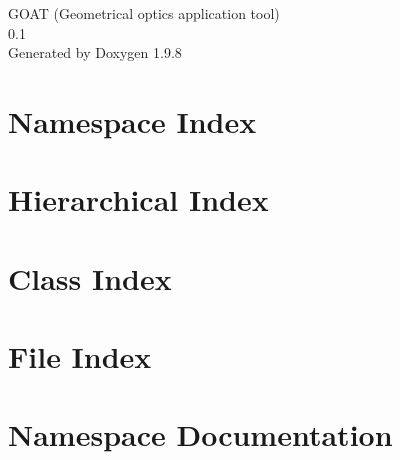 \documentclass[twoside]{book}
\newcommand{\+}{\discretionary{\mbox{\scriptsize$\hookleftarrow$}}{}{}}
\newcommand{\clearemptydoublepage}{%
    \newpage{\pagestyle{empty}\cleardoublepage}%
  }
\begin{document}
  \raggedbottom
    \hypersetup{pageanchor=false,
                bookmarksnumbered=true,
                pdfencoding=unicode
               }
  \begin{titlepage}
  \vspace*{7cm}
  \begin{center}%
  {\Large GOAT (\+Geometrical optics application tool)}\\
  [1ex]\large 0.\+1 \\
  \vspace*{1cm}
  {\large Generated by Doxygen 1.9.8}\\
  \end{center}
  \end{titlepage}
  \clearemptydoublepage
  \tableofcontents
  \clearemptydoublepage
  \hypersetup{pageanchor=true}


\chapter{Namespace Index}

\chapter{Hierarchical Index}

\chapter{Class Index}

\chapter{File Index}

\chapter{Namespace Documentation}





\end{document}
